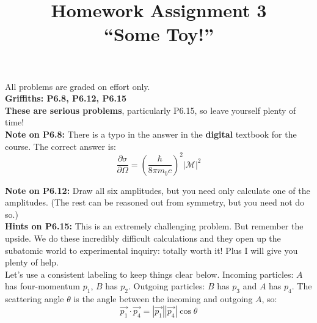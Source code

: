 \documentclass[12pt]{article}
\begin{document}
\newcommand{\ihbar}{\ensuremath{i \hbar}}
\newcommand{\dPsidt}{\ensuremath{ \frac{\partial \Psi}{\partial t} }}
\newcommand{\dPsidx}{\ensuremath{ \frac{\partial \Psi}{\partial x} }}
\newcommand{\ddPsidx}{\ensuremath{ \frac{\partial^2 \Psi}{\partial x^2} }}
\newcommand{\dPssdt}{\ensuremath{ \frac{\partial \Psi^*}{\partial t} }}
\newcommand{\dPssdx}{\ensuremath{ \frac{\partial \Psi^*}{\partial x} }}
\newcommand{\ddPssdx}{\ensuremath{ \frac{\partial^2 \Psi^*}{\partial x^2} }}

\newcommand{\dphidt}{\ensuremath{ \frac{d \phi}{dt} }}
\newcommand{\dpsidx}{\ensuremath{ \frac{d \psi}{dx} }}
\newcommand{\ddpsidx}{\ensuremath{ \frac{d^2 \psi}{dx^2} }}


\date{\vspace{-5ex}}

\title{Homework Assignment 3 \\ ``Some Toy!''}

\maketitle

\noindent
All problems are graded on effort only.\\

\noindent
{\bf Griffiths: P6.8, P6.12, P6.15}\\[5pt]

\noindent
{\bf These are serious problems}, particularly P6.15, so leave yourself plenty
of time!\\[5pt] 

\noindent
    {\bf Note on P6.8:} There is a typo in the answer in the {\bf digital} textbook for the course.  The correct answer is:
$$\frac{\partial \sigma}{\partial \Omega} = \left( \frac{\hbar}{8 \pi m_b c} \right)^2 | \mathcal{M} |^2$$

   

\noindent
{\bf Note on P6.12:} Draw all six amplitudes, but you need only calculate one of the amplitudes.  (The rest can be reasoned out from symmetry, but you need not do so.)\\[5pt]

\noindent
{\bf Hints on P6.15:} This is an extremely challenging problem.  But remember the upside. We do these incredibly difficult calculations and they open up the subatomic world to experimental inquiry: totally worth it!  Plus I will give you plenty of help.\\[5pt]

\noindent
Let's use a consistent labeling to keep things clear below.  Incoming particles: $A$ has four-momentum $p_1$, $B$ has $p_2$.  Outgoing particles: $B$ has $p_3$ and $A$ has $p_4$.  The scattering angle $\theta$ is the angle between the incoming and outgoing $A$, so:
$$\vec{p_1} \cdot \vec{p_4} = |\vec{p_1}| |\vec{p_4}| \cos\theta$$\\
\end{document}
